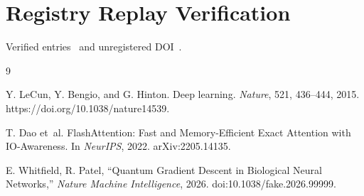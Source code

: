 \documentclass{article}
\begin{document}
\section{Registry Replay Verification}\label{sec:replay}
Verified entries~\cite{lecun2015, dao2022} and unregistered DOI~\cite{fake_whitfield2026}.

\begin{thebibliography}{9}

Y. LeCun, Y. Bengio, and G. Hinton. Deep learning. \emph{Nature}, 521, 436--444, 2015. https://doi.org/10.1038/nature14539.

T. Dao et~al. FlashAttention: Fast and Memory-Efficient Exact Attention with IO-Awareness. In \emph{NeurIPS}, 2022. arXiv:2205.14135.

E. Whitfield, R. Patel, ``Quantum Gradient Descent in Biological Neural Networks,'' \emph{Nature Machine Intelligence}, 2026. doi:10.1038/fake.2026.99999.

\end{thebibliography}
\end{document}
